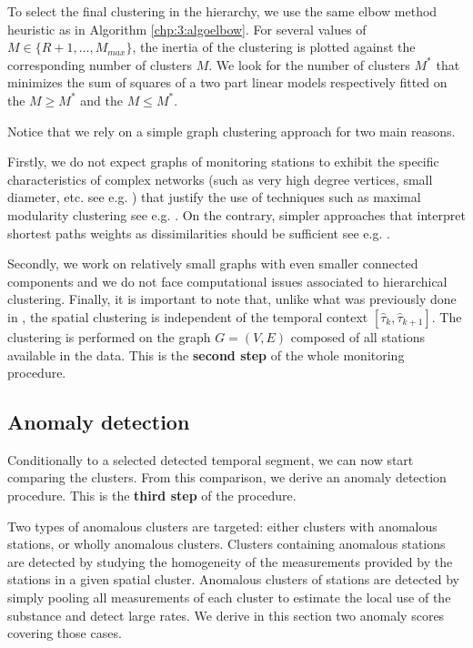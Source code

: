 To select the final clustering in the hierarchy, we use the same elbow method heuristic as in Algorithm \ref{chp:3:algoelbow}. For several values of $M\in\{R+1,\dots,M_{max}\}$, the inertia of the clustering is plotted against the corresponding number of clusters $M$. We look for the number of clusters $M^*$ that minimizes the sum of squares of a two part linear models respectively fitted on the $M \geq M^*$ and the $M \leq M^*$.      

Notice that we rely on a simple graph clustering approach for two main reasons. 

Firstly, we do not expect graphs of monitoring stations to exhibit the specific characteristics of complex networks (such as very high degree vertices, small diameter, etc. see e.g. \cite{Newman2003GraphSurveySIAM}) that justify the use of techniques such as maximal modularity clustering see e.g. \cite{FortunatoSurveyGraphs2010}. On the contrary, simpler approaches that interpret shortest paths weights as dissimilarities should be sufficient see e.g. \cite{Schaeffer:COSREV2007}. 

Secondly, we work on relatively small graphs with even smaller connected components and we do not face computational issues associated to hierarchical clustering. 
\linebreak
Finally, it is important to note that, unlike what was previously done in \cite{Laroche2022}, the spatial clustering is independent of the temporal context $[\widehat{\tau}_k,\widehat{\tau}_{k+1}]$. The clustering is performed on the graph $G=(V,E)$ composed of all stations available in the data. This is the \textbf{second step} of the whole monitoring procedure.

\subsection{Anomaly detection}\label{section:anomaly}

Conditionally to a selected detected temporal segment, we can now start comparing the clusters. From this comparison, we derive an anomaly detection procedure. This is the \textbf{third step} of the procedure.   

Two types of anomalous clusters are targeted: either clusters with anomalous stations, or wholly anomalous clusters. Clusters containing anomalous stations are detected by studying the homogeneity of the measurements provided by the stations in a given spatial cluster. Anomalous clusters of stations are detected by simply pooling all measurements of each cluster to estimate the local use of the substance and detect large rates. We derive in this section two anomaly scores covering those cases.

